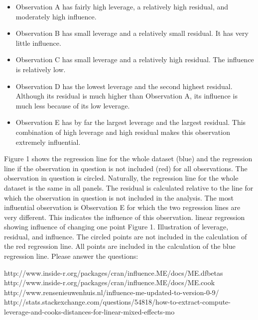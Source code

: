 \begin{itemize}
\item Observation A has fairly high leverage, a relatively high residual, and moderately high influence.

\item Observation B has small leverage and a relatively small residual. It has very little influence.

\item Observation C has small leverage and a relatively high residual. The influence is relatively low.

\item Observation D has the lowest leverage and the second highest residual. Although its residual is much higher than Observation A, its influence is much less because of its low leverage.

\item Observation E has by far the largest leverage and the largest residual. This combination of high leverage and high residual makes this observation extremely influential.
\end{itemize}

Figure 1 shows the regression line for the whole dataset (blue) and the regression line if the observation in question is not included (red) for all observations. The observation in question is circled. Naturally, the regression line for the whole dataset is the same in all panels. The residual is calculated relative to the line for which the observation in question is not included in the analysis. The most influential observation is Observation E for which the two regression lines are very different. This indicates the influence of this observation.
linear regression showing influence of changing one point
Figure 1. Illustration of leverage, residual, and influence. The circled points are not included in the calculation of the red regression line. All points are included in the calculation of the blue regression line.
Please answer the questions:

http://www.inside-r.org/packages/cran/influence.ME/docs/ME.dfbetas
http://www.inside-r.org/packages/cran/influence.ME/docs/ME.cook
http://www.rensenieuwenhuis.nl/influence-me-updated-to-version-0-9/
http://stats.stackexchange.com/questions/54818/how-to-extract-compute-leverage-and-cooks-distances-for-linear-mixed-effects-mo
